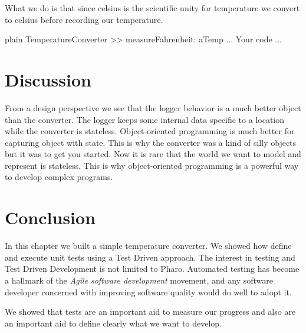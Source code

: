\documentclass[10pt,twoside,english]{_support/latex/sbabook/sbabook}
\begin{document}
What we do is that since celsius is the scientific unity for temperature we convert to celsius before recording our temperature. 

\begin{displaycode}{plain}
TemperatureConverter >> measureFahrenheit: aTemp
	... Your code ...
\end{displaycode}
\section{Discussion }
From a design perspective we see that the logger behavior is a much better object than the converter. The logger keeps some internal data specific to a location while the converter is stateless. Object-oriented programming is much better for capturing object with state. This is why the converter was a kind of silly objects but it was to get you started. 
Now it is rare that the world we want to model and represent is stateless. This is why object-oriented programming is a powerful way to develop complex programs.
\section{Conclusion}
In this chapter we built a simple temperature converter. We showed how define and execute unit tests using a Test Driven approach. The interest in testing and Test Driven Development is not limited to Pharo. Automated testing has become a hallmark of the \textit{Agile software development} movement, and any software developer concerned with improving
software quality would do well to adopt it.

We showed that tests are an important aid to measure our progress and also are an important aid to define clearly what we want to develop.



\backmatter



\end{document}
